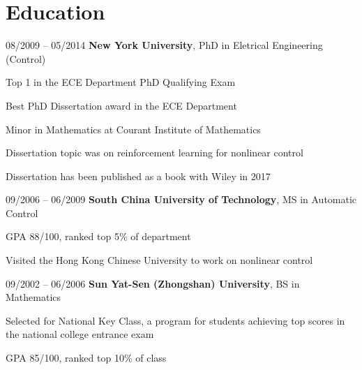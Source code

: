 \section{Education}
\begin{twocolentry}{
    08/2009 – 05/2014
}
    \textbf{New York University}, PhD in Eletrical Engineering (Control)\end{twocolentry}
\vspace{0.10 cm}
\begin{onecolentry}
    \begin{highlights}
       \item Top 1 in the ECE Department PhD Qualifying Exam
       \item Best PhD Dissertation award in the ECE Department
       \item Minor in Mathematics at Courant Institute of Mathematics
       \item Dissertation topic was on reinforcement learning for nonlinear control 
       \item Dissertation has been
published as a book with Wiley in 2017
    \end{highlights}
\end{onecolentry}
\vspace{0.25 cm}
\begin{twocolentry}{
    09/2006 – 06/2009
}
    \textbf{South China University of Technology}, MS in Automatic Control \end{twocolentry}

\vspace{0.1 cm}
\begin{onecolentry}
    \begin{highlights}
        \item GPA 88/100, ranked top 5\% of department
        \item Visited the Hong Kong Chinese University to work on nonlinear control
    \end{highlights}
\end{onecolentry}
\begin{twocolentry}{
    09/2002 – 06/2006
}
\vspace{0.25 cm}
    \textbf{Sun Yat-Sen (Zhongshan) University}, BS in Mathematics \end{twocolentry}
\vspace{0.1 cm}
\begin{onecolentry}
    \begin{highlights}
        \item Selected for National Key Class, a program for students achieving top scores in the national college entrance exam
        \item GPA 85/100, ranked top 10\% of class %
    \end{highlights}
\end{onecolentry}
